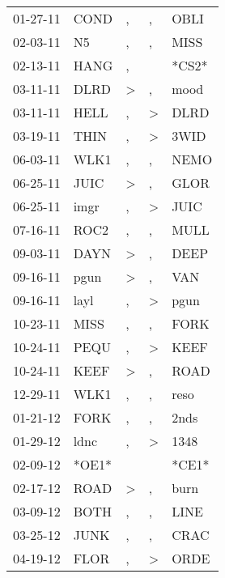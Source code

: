 \begin{supertabular}{lllll}
 01-27-11 &   COND &                , &                , &   OBLI \\
 02-03-11 &     N5 &                , &                , &   MISS \\
 02-13-11 &   HANG &                , &                  &  *CS2* \\
 03-11-11 &   DLRD &     \textgreater &                , &   mood \\
 03-11-11 &   HELL &                , &     \textgreater &   DLRD \\
 03-19-11 &   THIN &                , &     \textgreater &   3WID \\
 06-03-11 &   WLK1 &                , &                , &   NEMO \\
 06-25-11 &   JUIC &     \textgreater &                , &   GLOR \\
 06-25-11 &   imgr &                , &     \textgreater &   JUIC \\
 07-16-11 &   ROC2 &                , &                , &   MULL \\
 09-03-11 &   DAYN &     \textgreater &                , &   DEEP \\
 09-16-11 &   pgun &     \textgreater &                , &    VAN \\
 09-16-11 &   layl &                , &     \textgreater &   pgun \\
 10-23-11 &   MISS &                , &                , &   FORK \\
 10-24-11 &   PEQU &                , &     \textgreater &   KEEF \\
 10-24-11 &   KEEF &     \textgreater &                , &   ROAD \\
 12-29-11 &   WLK1 &                , &                , &   reso \\
 01-21-12 &   FORK &                , &                , &   2nds \\
 01-29-12 &   ldnc &                , &     \textgreater &   1348 \\
 02-09-12 &  *OE1* &                  &                  &  *CE1* \\
 02-17-12 &   ROAD &     \textgreater &                , &   burn \\
 03-09-12 &   BOTH &                , &                , &   LINE \\
 03-25-12 &   JUNK &                , &                , &   CRAC \\
 04-19-12 &   FLOR &                , &     \textgreater &   ORDE \\

\end{supertabular}
